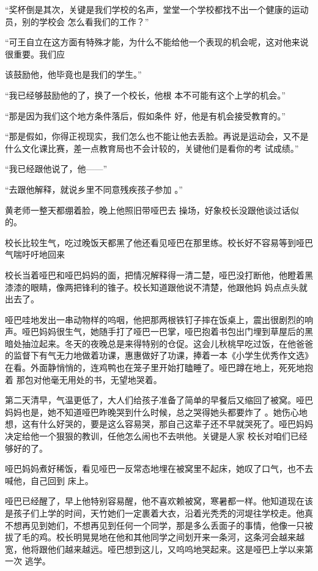 \documentclass{article}
\begin{document}
“奖杯倒是其次，关键是我们学校的名声，堂堂一个学校都找不出一个健康的运动员，别的学校会
怎么看我们的工作？” 

“可王自立在这方面有特殊才能，为什么不能给他一个表现的机会呢，这对他来说很重要。我们应
\newpage

该鼓励他，他毕竟也是我们的学生。” 

“我已经够鼓励他的了，换了一个校长，他根
本不可能有这个上学的机会。” 

“那是因为我们这个地方条件落后，假如条件
好，他是有机会接受教育的。” 

“那是假如，你得正视现实，我们怎么也不能让他去丢脸。再说是运动会，又不是什么文化课比赛，差一点教育局也不会计较的，关键他们是看你的考
试成绩。” 


“我已经跟他说了，他——” 

“去跟他解释，就说乡里不同意残疾孩子参加
。” 

黄老师一整天都绷着脸，晚上他照旧带哑巴去
操场，好象校长没跟他谈过话似的。 

\newpage

校长比较生气，吃过晚饭天都黑了他还看见哑巴在那里练。校长好不容易等到哑巴气喘吁吁地回来

校长当着哑巴和哑巴妈妈的面，把情况解释得一清二楚，哑巴没打断他，他瞪着黑漆漆的眼睛，像两把锋利的锥子。校长知道跟他说不清楚，他跟他妈
妈点点头就出去了。 

哑巴哇地发出一串动物样的呜咽，他把那两根铁钉子摔在饭桌上，震出很剧烈的响声。哑巴妈妈很生气，她随手打了哑巴一巴掌，哑巴抱着书包出门埋到草屋后的黑暗处抽泣起来。冬天的夜晚总是来得特别的仓促。这会儿秋桃早吃过饭，在他爸爸的监督下有气无力地做着功课，惠惠做好了功课，捧着一本《小学生优秀作文选》在看。外面静悄悄的，连鸡鸭也在笼子里开始打瞌睡了。哑巴蹲在地上，死死地抱着
那包对他毫无用处的书，无望地哭着。 

第二天清早，气温更低了，大人们给孩子准备了简单的早餐后又缩回了被窝。哑巴妈妈也是，她不知道哑巴昨晚哭到什么时候，总之哭得她头都要炸了
\newpage
。她伤心地想，这有什么好哭的，要是这么容易哭，那自己这辈子还不早就哭死了。哑巴妈妈决定给他一个狠狠的教训，任他怎么闹也不去哄他。关键是人家
校长对咱们已经够好的了。 

哑巴妈妈煮好稀饭，看见哑巴一反常态地埋在被窝里不起床，她叹了口气，也不去喊他，自己回到
床上。 

哑巴已经醒了，早上他特别容易醒，他不喜欢赖被窝，寒暑都一样。他知道现在该是孩子们上学的时间，天竹她们一定裹着大衣，沿着光秃秃的河堤往学校走。他真不想再见到她们，不想再见到任何一个同学，那是多么丢面子的事情，他像一只被拔了毛的鸡。校长明晃晃地在他和其他同学之间划开来一条河，这条河会越来越宽，他将跟他们越来越远。哑巴想到这儿，又呜呜地哭起来。这是哑巴上学以来第一次
逃学。 
\end{document}
